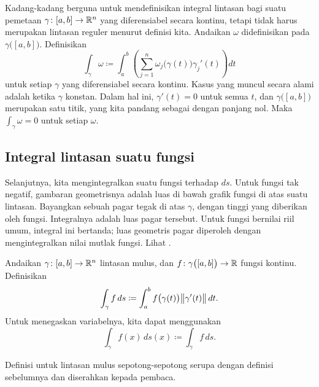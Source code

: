 Kadang-kadang berguna untuk mendefinisikan integral lintasan bagi suatu pemetaan
$\gamma \colon [a,b] \to {\mathbb{R}}^n$ yang diferensiabel secara kontinu, tetapi tidak harus
merupakan lintasan reguler menurut definisi kita.  Andaikan $\omega$ didefinisikan
pada $\gamma\bigl([a,b]\bigr)$.  Definisikan
\begin{equation*}
\int_{\gamma} \omega \coloneqq \int_a^b
\left(
\sum_{j=1}^n
\omega_j\bigl(\gamma(t)\bigr) \gamma_j'(t)
\right) dt 
\end{equation*}
untuk setiap $\gamma$ yang diferensiabel secara kontinu.  Kasus yang
muncul secara alami adalah ketika $\gamma$ konstan.  Dalam hal ini,
$\gamma'(t) = 0$ untuk semua $t$, dan $\gamma\bigl([a,b]\bigr)$ merupakan satu
titik, yang kita pandang sebagai  dengan panjang nol.  Maka
$\int_{\gamma} \omega = 0$ untuk setiap $\omega$.

\subsection{Integral lintasan suatu fungsi}

Selanjutnya, kita mengintegralkan suatu fungsi terhadap
\emph{} $ds$.  Untuk fungsi tak negatif, gambaran geometrisnya
adalah luas di bawah grafik fungsi di atas suatu lintasan.
Bayangkan sebuah pagar tegak di atas $\gamma$, dengan tinggi yang diberikan oleh fungsi.
Integralnya adalah luas pagar tersebut.  Untuk fungsi bernilai riil umum, integral ini
bertanda; luas geometris pagar diperoleh dengan mengintegralkan nilai mutlak fungsi.
Lihat .
\begin{myfigureht}
\caption{Lintasan $\gamma \colon [a,b] \to \R^2$ pada bidang $xy$ (kurva tebal), dan fungsi
$z=f(x,y)$ yang digambarkan di atasnya dalam arah $z$.  Untuk $f\geq0$, integral merupakan
luas berarsir yang ditampilkan.\label{fig:fenceintegral}}
\end{myfigureht}

\begin{defn}
Andaikan $\gamma \colon [a,b] \to {\mathbb{R}}^n$ lintasan mulus, dan
$f \colon \gamma\bigl([a,b]\bigr) \to {\mathbb{R}}$ fungsi kontinu.  Definisikan
\begin{equation*}
\int_{\gamma} f \,ds \coloneqq
\int_a^b f\bigl( \gamma(t) \bigr) \bigl\lVert {\gamma'(t)} \bigr\rVert \, dt .
\end{equation*}
Untuk menegaskan variabelnya, kita dapat menggunakan
\begin{equation*}
\int_{\gamma} f(x) \,ds(x) \coloneqq \int_{\gamma} f \,ds .
\end{equation*}

Definisi untuk lintasan mulus sepotong-sepotong serupa dengan definisi sebelumnya
dan diserahkan kepada pembaca.
\end{defn}

